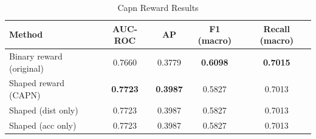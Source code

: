 \begin{table}[ht]
\centering
\caption{Capn Reward Results}
\label{tab:capn_reward}
\begin{tabular}{lcccc}
\toprule
Method & AUC-ROC & AP & F1 (macro) & Recall (macro) \\
\midrule
Binary reward (original) & 0.7660 & 0.3779 & \textbf{0.6098} & \textbf{0.7015} \\
Shaped reward (CAPN) & \textbf{0.7723} & \textbf{0.3987} & 0.5827 & 0.7013 \\
Shaped (dist only) & 0.7723 & 0.3987 & 0.5827 & 0.7013 \\
Shaped (acc only) & 0.7723 & 0.3987 & 0.5827 & 0.7013 \\
\bottomrule
\end{tabular}
\end{table}
